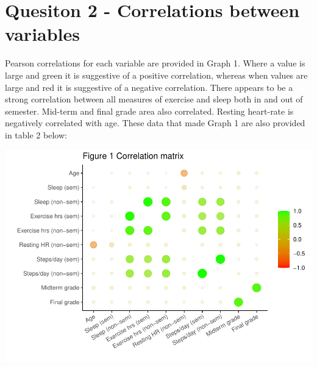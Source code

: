 \documentclass[preprint, 3p,
authoryear]{elsarticle} %
\begin{document}
\hypertarget{quesiton-2---correlations-between-variables}{%
\section{Quesiton 2 - Correlations between
variables}\label{quesiton-2---correlations-between-variables}}

Pearson correlations for each variable are provided in Graph 1. Where a
value is large and green it is suggestive of a positive correlation,
whereas when values are large and red it is suggestive of a negative
correlation. There appears to be a strong correlation between all
measures of exercise and sleep both in and out of semester. Mid-term and
final grade area also correlated. Resting heart-rate is negatively
correlated with age. These data that made Graph 1 are also provided in
table 2 below:

\includegraphics{assignment_2_files/figure-latex/pressure-1.pdf}
\end{document}

